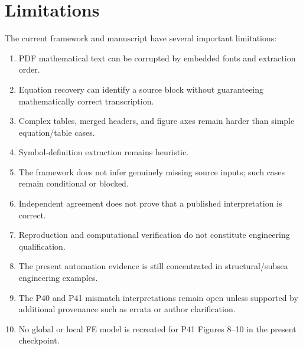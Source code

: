 \section{Limitations}
The current framework and manuscript have several important limitations:
\begin{enumerate}[leftmargin=1.6em]
  \item PDF mathematical text can be corrupted by embedded fonts and extraction order.
  \item Equation recovery can identify a source block without guaranteeing mathematically correct transcription.
  \item Complex tables, merged headers, and figure axes remain harder than simple equation/table cases.
  \item Symbol-definition extraction remains heuristic.
  \item The framework does not infer genuinely missing source inputs; such cases remain conditional or blocked.
  \item Independent agreement does not prove that a published interpretation is correct.
  \item Reproduction and computational verification do not constitute engineering qualification.
  \item The present automation evidence is still concentrated in structural/subsea engineering examples.
  \item The P40 and P41 mismatch interpretations remain open unless supported by additional provenance such as errata or author clarification.
  \item No global or local FE model is recreated for P41 Figures 8--10 in the present checkpoint.
\end{enumerate}
